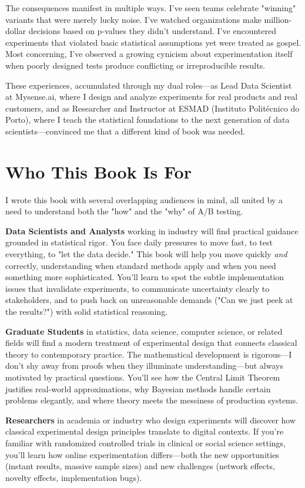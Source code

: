 The consequences manifest in multiple ways. I've seen teams celebrate "winning" variants that were merely lucky noise. I've watched organizations make million-dollar decisions based on p-values they didn't understand. I've encountered experiments that violated basic statistical assumptions yet were treated as gospel. Most concerning, I've observed a growing cynicism about experimentation itself when poorly designed tests produce conflicting or irreproducible results.

These experiences, accumulated through my dual roles—as Lead Data Scientist at Mysense.ai, where I design and analyze experiments for real products and real customers, and as Researcher and Instructor at ESMAD (Instituto Politécnico do Porto), where I teach the statistical foundations to the next generation of data scientists—convinced me that a different kind of book was needed.

\section*{Who This Book Is For}

I wrote this book with several overlapping audiences in mind, all united by a need to understand both the "how" and the "why" of A/B testing.

\textbf{Data Scientists and Analysts} working in industry will find practical guidance grounded in statistical rigor. You face daily pressures to move fast, to test everything, to "let the data decide." This book will help you move quickly \textit{and} correctly, understanding when standard methods apply and when you need something more sophisticated. You'll learn to spot the subtle implementation issues that invalidate experiments, to communicate uncertainty clearly to stakeholders, and to push back on unreasonable demands ("Can we just peek at the results?") with solid statistical reasoning.

\textbf{Graduate Students} in statistics, data science, computer science, or related fields will find a modern treatment of experimental design that connects classical theory to contemporary practice. The mathematical development is rigorous—I don't shy away from proofs when they illuminate understanding—but always motivated by practical questions. You'll see how the Central Limit Theorem justifies real-world approximations, why Bayesian methods handle certain problems elegantly, and where theory meets the messiness of production systems.

\textbf{Researchers} in academia or industry who design experiments will discover how classical experimental design principles translate to digital contexts. If you're familiar with randomized controlled trials in clinical or social science settings, you'll learn how online experimentation differs—both the new opportunities (instant results, massive sample sizes) and new challenges (network effects, novelty effects, implementation bugs).

